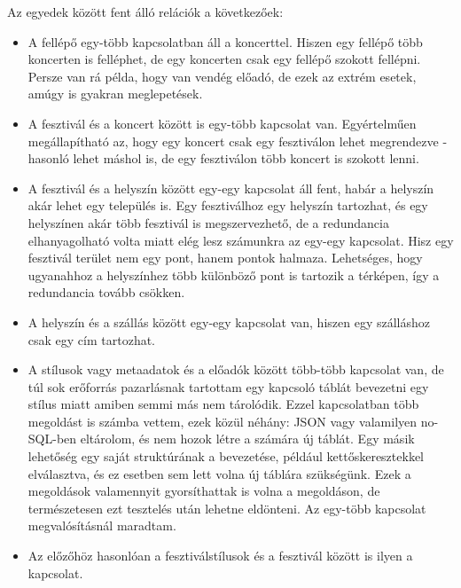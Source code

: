 Az egyedek között fent álló relációk a következőek:
\begin{itemize}
\item A fellépő egy-több kapcsolatban áll a koncerttel. Hiszen egy fellépő több koncerten is felléphet, de egy koncerten csak egy fellépő szokott fellépni. Persze van rá példa, hogy van vendég előadó, de ezek az extrém esetek, amúgy is gyakran meglepetések.
\item A fesztivál és a koncert között is egy-több kapcsolat van. Egyértelműen megállapítható az, hogy egy koncert csak egy fesztiválon lehet megrendezve - hasonló lehet máshol is, de egy fesztiválon több koncert is szokott lenni.
\item A fesztivál és a helyszín között egy-egy kapcsolat áll fent, habár a helyszín akár lehet egy település is. Egy fesztiválhoz egy helyszín tartozhat, és egy helyszínen akár több fesztivál is megszervezhető, de a redundancia elhanyagolható volta miatt elég lesz számunkra az egy-egy kapcsolat. Hisz egy fesztivál terület nem egy pont, hanem pontok halmaza. Lehetséges, hogy ugyanahhoz a helyszínhez több különböző pont is tartozik a térképen, így a redundancia tovább csökken.
\item  A helyszín és a szállás között egy-egy kapcsolat van, hiszen egy szálláshoz csak egy cím tartozhat.
\item A stílusok vagy metaadatok és a előadók között több-több kapcsolat van, de túl sok erőforrás pazarlásnak tartottam egy kapcsoló táblát bevezetni egy stílus miatt amiben semmi más nem tárolódik. Ezzel kapcsolatban több megoldást is számba vettem, ezek közül néhány: JSON vagy valamilyen no-SQL-ben eltárolom, és nem hozok létre a számára új táblát. Egy másik lehetőség egy saját struktúrának a bevezetése, például kettőskeresztekkel elválasztva, és ez esetben sem lett volna új táblára szükségünk. Ezek a megoldások valamennyit gyorsíthattak is volna a megoldáson, de természetesen ezt tesztelés után lehetne eldönteni. Az egy-több kapcsolat megvalósításnál maradtam.
\item Az előzőhöz hasonlóan a fesztiválstílusok és a fesztivál között is ilyen a kapcsolat.
\end{itemize}

